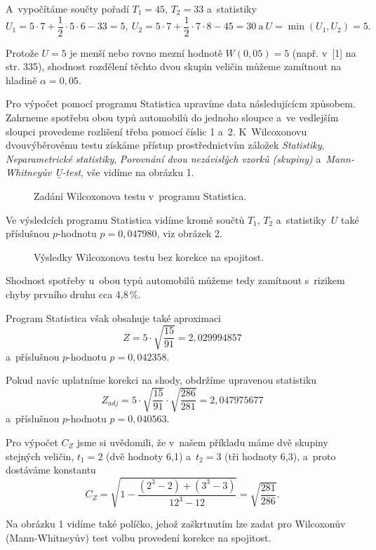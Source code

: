 A~vypočítáme součty pořadí $T_1=45$, $T_2=33$ a~statistiky
$$U_1=5\cdot 7 + \frac12 \cdot 5\cdot 6 -33=5 , \
U_2=5\cdot 7 + \frac12 \cdot 7\cdot 8 -45=30 \ \mbox{a} \ U=\min(U_1,U_2)=5 .$$

Protože $U=5$ je menší nebo rovno mezní hodnotě $W(0{,}05)=5$ (např. v~[1] na str. 335), shodnost rozdělení těchto dvou skupin veličin můžeme zamítnout na hladině $\alpha = 0{,}05$.

Pro výpočet pomocí programu Statistica upravíme data následujícícm způsobem. Zahrneme spotřebu obou typů automobilů do jednoho sloupce a~ve vedlejším sloupci provedeme rozlišení třeba pomocí číslic 1 a~2. K~Wilcoxonovu dvouvýběrovému testu získáme přístup prostřednictvím záložek {\it Statistiky}, {\it Neparametrické statistiky}, {\it Porovnání dvou nezávislých vzorků (skupiny)} a~{\it Mann-Whitneyův \b{U}-test}, vše vidíme na  obrázku 1.

\begin{figure}[!ht]
\caption{Zadání Wilcoxonova testu v~programu Statistica.}
\end{figure}

Ve výsledcích programu Statistica vidíme kromě součtů $T_1$, $T_2$ a~statistiky~$U$ také příslušnou $p$-hodnotu $p=0{,}047980$, viz obrázek 2.

\begin{figure}[!hbt]
\caption{Výsledky Wilcoxonova testu bez korekce na spojitost.}
\end{figure}

Shodnost spotřeby u~obou typů automobilů můžeme tedy zamítnout s~rizikem chyby prvního druhu cca 4,8\,\%.

Program Statistica však obsahuje také aproximaci
$$ Z=5\cdot \sqrt{ \frac{15}{91}} =2{,}029994857 $$
a~příslušnou $p$-hodnotu $p=0{,}042358$.

Pokud navíc uplatníme korekci na shody, obdržíme upravenou statistiku
$$ Z_{adj}=5\cdot \sqrt{ \frac{15}{91}}\cdot \sqrt{\frac{286}{281}} =2{,}047975677 $$
a~příslušnou $p$-hodnotu $p=0{,}040563$.

Pro výpočet $C_Z$ jsme si uvědomili, že v~našem příkladu máme dvě skupiny stejných veličin,  $t_1=2$ (dvě hodnoty 6,1)  a~$t_2=3$ (tři hodnoty 6,3), a~proto dostáváme konstantu
$$C_Z=\sqrt{1-\frac{(2^3-2) + (3^3-3)}{12^3-12}}=\sqrt{\frac{281}{286}} .$$

Na obrázku 1 vidíme také políčko, jehož zaškrtnutím lze zadat pro Wilcoxonův (Mann-Whitneyův) test volbu provedení korekce na spojitost.


